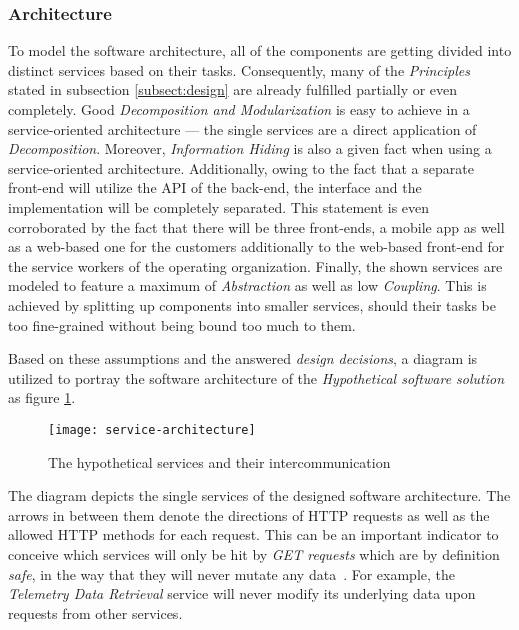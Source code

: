 \documentclass[12pt,a4paper]{report}
\begin{document}
\subsubsection{Architecture}

To model the software architecture, all of the components are getting divided
into distinct services based on their tasks. Consequently, many of the
\textit{Principles} stated in subsection \ref{subsect:design} are already fulfilled
partially or even completely. Good \textit{Decomposition and Modularization} is
easy to achieve in a service-oriented architecture --- the single services
are a direct application of \textit{Decomposition}.
Moreover, \textit{Information Hiding} is also a given fact when using a
service-oriented architecture.
Additionally, owing to the fact that a separate front-end will utilize the API
of the back-end, the interface and the implementation will be completely separated.
This statement is even corroborated by the fact that there will be three front-ends,
a mobile app as well as a web-based one for the customers additionally to the
web-based front-end for the service workers of the operating organization.
Finally, the shown services are modeled to feature a maximum of \textit{Abstraction}
as well as low \textit{Coupling}. This is achieved by splitting up components
into smaller services, should their tasks be too fine-grained without being
bound too much to them.

Based on these assumptions and the answered \textit{design decisions},
a diagram is utilized to portray the software architecture of the
\textit{Hypothetical software solution} as figure \ref{fig:service-architecture}.

\begin{figure}[htb]
\centering
\texttt{[image: service-architecture]}
\caption{The hypothetical services and their intercommunication}
\label{fig:service-architecture}
\end{figure}

The diagram depicts the single services of the designed software architecture.
The arrows in between them denote the directions of HTTP requests as well
as the allowed HTTP methods for each request.
This can be an important indicator to conceive which services
will only be hit by \textit{GET requests} which are by definition \textit{safe},
in the way that they will never mutate any data~\cite{http-rfc}.
For example, the \textit{Telemetry Data Retrieval} service will never modify
its underlying data upon requests from other services.
\end{document}
